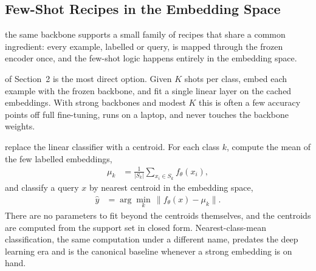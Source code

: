 \subsection{Few-Shot Recipes in the Embedding Space}

 the same backbone supports a small family of recipes that share a common ingredient: every example, labelled or query, is mapped through the frozen encoder once, and the few-shot logic happens entirely in the embedding space.

 of Section~2 is the most direct option. Given $K$ shots per class, embed each example with the frozen backbone, and fit a single linear layer on the cached embeddings. With strong backbones and modest $K$ this is often a few accuracy points off full fine-tuning, runs on a laptop, and never touches the backbone weights.

\cite{Snell2017Prototypical} replace the linear classifier with a centroid. For each class $k$, compute the mean of the few labelled embeddings,
\begin{align*}
    \mu_k &= \tfrac{1}{|S_k|} \sum_{x_i \in S_k} f_\theta(x_i),
\end{align*}
and classify a query $x$ by nearest centroid in the embedding space,
\begin{align*}
    \hat{y} &= \arg\min_k \, \lVert f_\theta(x) - \mu_k \rVert.
\end{align*}
There are no parameters to fit beyond the centroids themselves, and the centroids are computed from the support set in closed form. Nearest-class-mean classification, the same computation under a different name, predates the deep learning era and is the canonical baseline whenever a strong embedding is on hand.

